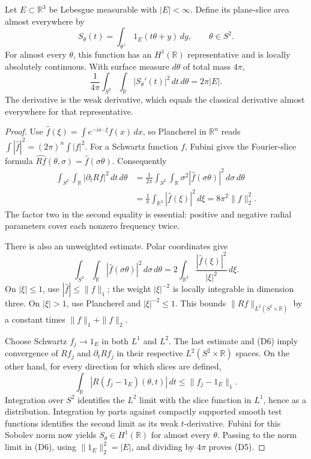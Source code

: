 \begin{theorem}\ours
Let \(E\subset\mathbb R^3\) be Lebesgue measurable with \(|E|<\infty\). Define its plane-slice area almost everywhere by
\[
 S_\theta(t)=\int_{\theta^\perp}1_E(t\theta+y)\,dy,
 \qquad \theta\in S^2.
\]
For almost every \(\theta\), this function has an \(H^1(\mathbb R)\) representative and is locally absolutely continuous. With surface measure \(d\theta\) of total mass \(4\pi\),
\[
 \frac1{4\pi}\int_{S^2}\int_{\mathbb R}|S_\theta'(t)|^2\,dt\,d\theta
       =2\pi |E|.
 \tag{D5}
\]
The derivative is the weak derivative, which equals the classical derivative almost everywhere for that representative.
\end{theorem}
\begin{proof}
Use \(\widehat f(\xi)=\int e^{-ix\cdot\xi}f(x)\,dx\), so Plancherel in \(\mathbb R^n\) reads
\(\int|\widehat f|^2=(2\pi)^n\int|f|^2\).
For a Schwartz function \(f\), Fubini gives the Fourier-slice formula
\(\widehat{Rf}(\theta,\sigma)=\widehat f(\sigma\theta)\).
Consequently
\[
 \begin{split}
 \int_{S^2}\int_{\mathbb R}|\partial_tRf|^2\,dt\,d\theta
 &=\frac1{2\pi}\int_{S^2}\int_{\mathbb R}
                  \sigma^2|\widehat f(\sigma\theta)|^2\,d\sigma\,d\theta\\
 &=\frac1{\pi}\int_{\mathbb R^3}|\widehat f(\xi)|^2\,d\xi
 =8\pi^2\|f\|_2^2.
 \end{split}
 \tag{D6}
\]
The factor two in the second equality is essential: positive and negative radial parameters cover each nonzero frequency twice.

There is also an unweighted estimate. Polar coordinates give
\[
 \int_{S^2}\int_{\mathbb R}|\widehat f(\sigma\theta)|^2\,d\sigma\,d\theta
 =2\int_{\mathbb R^3}\frac{|\widehat f(\xi)|^2}{|\xi|^2}\,d\xi.
\]
On \(|\xi|\le1\), use \(|\widehat f|\le\|f\|_1\); the weight \(|\xi|^{-2}\) is locally integrable in dimension three. On \(|\xi|>1\), use Plancherel and \(|\xi|^{-2}\le1\). This bounds \(\|Rf\|_{L^2(S^2\times\mathbb R)}\) by a constant times \(\|f\|_1+\|f\|_2\).

Choose Schwartz \(f_j\to1_E\) in both \(L^1\) and \(L^2\). The last estimate and (D6) imply convergence of \(Rf_j\) and \(\partial_tRf_j\) in their respective \(L^2(S^2\times\mathbb R)\) spaces. On the other hand, for every direction for which slices are defined,
\[
 \int_{\mathbb R}|R(f_j-1_E)(\theta,t)|\,dt
       \le\|f_j-1_E\|_1 .
\]
Integration over \(S^2\) identifies the \(L^2\) limit with the slice function in \(L^1\), hence as a distribution. Integration by parts against compactly supported smooth test functions identifies the second limit as its weak \(t\)-derivative. Fubini for this Sobolev norm now yields
\(S_\theta\in H^1(\mathbb R)\) for almost every \(\theta\). Passing to the norm limit in (D6), using \(\|1_E\|_2^2=|E|\), and dividing by \(4\pi\) proves (D5).
\end{proof}

